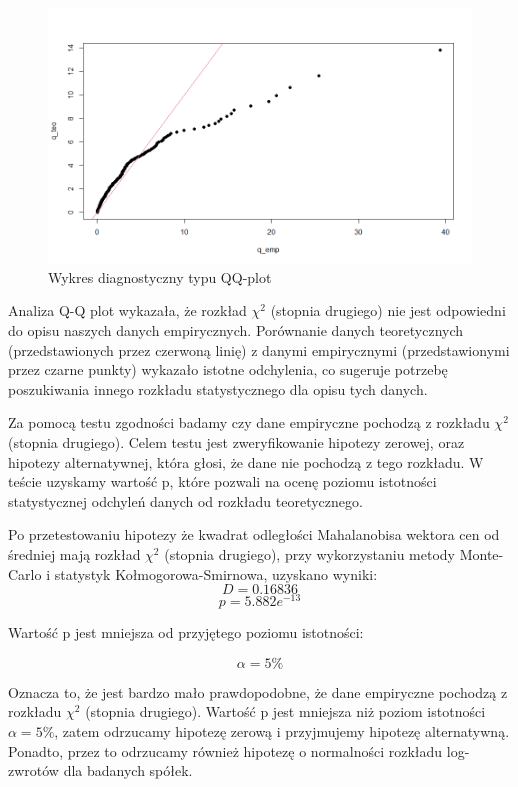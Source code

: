 \documentclass[a4paper,11pt]{article}
\def\\{\hfill\break}
\begin{document}
\begin{figure}[H]
    \includegraphics[width=12cm]{Wykresy/QQplot_Mahalanobis.png}
    \caption{Wykres diagnostyczny typu QQ-plot}
    \label{QQplot_Mahalanobis}
\end{figure}
 Analiza Q-Q plot wykazała, że rozkład $\chi^2$ (stopnia drugiego) nie jest odpowiedni do opisu naszych danych empirycznych. Porównanie danych teoretycznych (przedstawionych przez czerwoną linię) z danymi empirycznymi (przedstawionymi przez czarne punkty) wykazało istotne odchylenia, co sugeruje potrzebę poszukiwania innego rozkładu statystycznego dla opisu tych danych.

\\

Za pomocą testu zgodności badamy czy dane empiryczne pochodzą z rozkładu $\chi^2$ (stopnia drugiego). Celem testu jest zweryfikowanie hipotezy zerowej, oraz hipotezy alternatywnej, która głosi, że dane nie pochodzą z tego rozkładu. W teście uzyskamy wartość p, które pozwali na ocenę poziomu istotności statystycznej odchyleń danych od rozkładu teoretycznego.

\newpage


Po przetestowaniu hipotezy że kwadrat odległości Mahalanobisa wektora cen od średniej mają rozkład $\chi^2$ (stopnia drugiego), przy wykorzystaniu metody Monte-Carlo i statystyk Kołmogorowa-Smirnowa, uzyskano wyniki:
  $$ D = 0.16836 $$
  $$ p = 5.882e^{-13} $$ 

Wartość p jest mniejsza od przyjętego poziomu istotności:

   $$ \alpha  = 5\%$$
   
Oznacza to, że jest bardzo mało prawdopodobne, że dane empiryczne pochodzą z rozkładu $\chi^2$ (stopnia drugiego). Wartość p jest mniejsza niż poziom istotności $ \alpha  = 5\%$, zatem odrzucamy hipotezę zerową i przyjmujemy hipotezę alternatywną. Ponadto, przez to odrzucamy również hipotezę o normalności rozkładu log-zwrotów dla badanych spółek.
\end{document}
